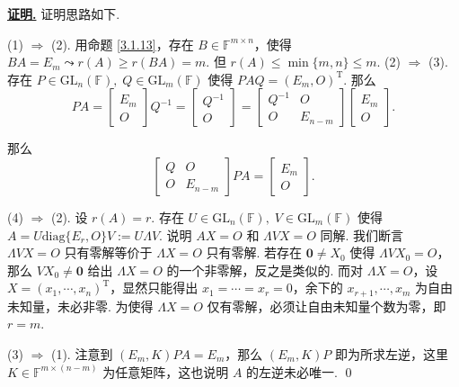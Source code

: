 \documentclass[10pt,openany]{article}
\theoremstyle{thmstyle} %
\theoremstyle{defstyle} %
\theoremstyle{prostyle} %
\theoremstyle{exastyle}
\theoremstyle{remstyle}
\renewenvironment{proof}[1][证明]{\par\underline{\textbf{#1.}} \;\fangsong}{\qed\par}
\newcommand{\T}{^{\text{T}}}
\newcommand{\F}{\mathbb{F}}
\newcommand{\gfn}{\text{GL}_n(\mathbb{F})}
\newcommand{\gfm}{\text{GL}_m(\mathbb{F})}
\newcommand{\mn}{^{m \times n}}
\newcommand{\diag}{\mathrm{diag}}
\begin{document}
\begin{proof}
	 证明思路如下.
	 \begin{center}
	 \end{center}
	 
	
	 (1) \( \Rightarrow \) (2). 用命题 \ref{3.1.13}，存在 \( B \in \F\mn \)，使得 \( BA=E_m \leadsto r(A) \geq r(BA)=m \). 但 \( r(A) \leq \min\{m,n\} \leq m \). (2) \( \Rightarrow \) (3). 存在 \( P \in \gfn, \; Q \in \gfm \) 使得 \( PAQ=(E_m,O)\T \). 那么 
	 \[ PA= \begin{bmatrix}
	 	E_m \\ O
	 \end{bmatrix}Q^{-1}=\begin{bmatrix}
	 Q^{-1} \\ O
	 \end{bmatrix}=\begin{bmatrix}
	 Q^{-1} & O \\
	 O & E_{n-m}
	 \end{bmatrix}\begin{bmatrix}
	 E_m \\ O
	 \end{bmatrix}. \]
	 
	 那么
	 \[ \begin{bmatrix}
	 	Q & O \\
	 	O & E_{n-m}
	 \end{bmatrix}PA=\begin{bmatrix}
	 E_m \\ O
	 \end{bmatrix}.  \]
	 
	 (4) \( \Rightarrow \) (2). 设 \( r(A)=r \). 存在 \( U \in \gfn, \; V \in \gfm \) 使得 \( A=U\diag\{E_r,O\}V:=U\Lambda V \). 说明 \( AX=O \) 和 \( \Lambda VX=O \) 同解. 我们断言 \( \Lambda VX=O \) 只有零解等价于 \( \Lambda X=O \) 只有零解. 若存在 \( \bm{0} \neq X_0 \) 使得 \( \Lambda VX_0=O \)，那么 \( VX_0 \neq \bm{0} \) 给出 \( \Lambda X=O \) 的一个非零解，反之是类似的. 而对 \( \Lambda X=O \)，设 \( X=(x_1,\cdots,x_n)\T \)，显然只能得出 \( x_1=\cdots=x_r=0 \)，余下的 \( x_{r+1},\cdots,x_m \) 为自由未知量，未必非零. 为使得 \( \Lambda X=O \) 仅有零解，必须让自由未知量个数为零，即 \( r=m \). 
	 
	 (3) \( \Rightarrow \) (1). 注意到  \( (E_m,K)PA=E_m \)，那么 \( (E_m,K)P \) 即为所求左逆，这里 \( K \in \F^{m \times (n-m)} \) 为任意矩阵，这也说明 \( A \) 的左逆未必唯一.
\end{proof}
\end{document}
